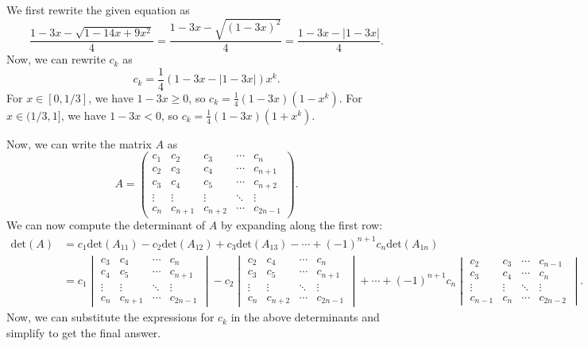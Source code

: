 We first rewrite the given equation as
\[
\frac{1-3x-\sqrt{1-14x+9x^2}}{4} = \frac{1-3x-\sqrt{(1-3x)^2}}{4} = \frac{1-3x-|1-3x|}{4}.
\]
Now, we can rewrite $c_k$ as
\[
c_k = \frac{1}{4} \left(1-3x-|1-3x|\right)x^k.
\]
For $x\in[0,1/3]$, we have $1-3x\geq 0$, so $c_k = \frac{1}{4}(1-3x)(1-x^k)$. For $x\in(1/3,1]$, we have $1-3x<0$, so $c_k = \frac{1}{4}(1-3x)(1+x^k)$. 

Now, we can write the matrix $A$ as
\[
A = \begin{pmatrix}
c_1 & c_2 & c_3 & \cdots & c_n \\
c_2 & c_3 & c_4 & \cdots & c_{n+1} \\
c_3 & c_4 & c_5 & \cdots & c_{n+2} \\
\vdots & \vdots & \vdots & \ddots & \vdots \\
c_n & c_{n+1} & c_{n+2} & \cdots & c_{2n-1}
\end{pmatrix}.
\]
We can now compute the determinant of $A$ by expanding along the first row:
\begin{align*}
\text{det}(A) &= c_1 \text{det}(A_{11}) - c_2 \text{det}(A_{12}) + c_3 \text{det}(A_{13}) - \cdots + (-1)^{n+1}c_n \text{det}(A_{1n}) \\
&= c_1 \begin{vmatrix} c_3 & c_4 & \cdots & c_n \\ c_4 & c_5 & \cdots & c_{n+1} \\ \vdots & \vdots & \ddots & \vdots \\ c_n & c_{n+1} & \cdots & c_{2n-1} \end{vmatrix} - c_2 \begin{vmatrix} c_2 & c_4 & \cdots & c_n \\ c_3 & c_5 & \cdots & c_{n+1} \\ \vdots & \vdots & \ddots & \vdots \\ c_n & c_{n+2} & \cdots & c_{2n-1} \end{vmatrix} + \cdots + (-1)^{n+1}c_n \begin{vmatrix} c_2 & c_3 & \cdots & c_{n-1} \\ c_3 & c_4 & \cdots & c_n \\ \vdots & \vdots & \ddots & \vdots \\ c_{n-1} & c_n & \cdots & c_{2n-2} \end{vmatrix}.
\end{align*}
Now, we can substitute the expressions for $c_k$ in the above determinants and simplify to get the final answer.
